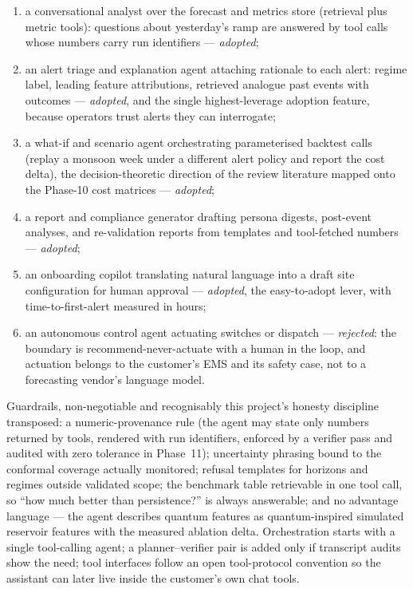 \begin{enumerate}
\item a conversational analyst over the forecast and metrics store
  (retrieval plus metric tools): questions about yesterday's ramp are
  answered by tool calls whose numbers carry run identifiers ---
  \emph{adopted};
\item an alert triage and explanation agent attaching rationale to each
  alert: regime label, leading feature attributions, retrieved analogue
  past events with outcomes --- \emph{adopted}, and the single
  highest-leverage adoption feature, because operators trust alerts they
  can interrogate;
\item a what-if and scenario agent orchestrating parameterised backtest
  calls (replay a monsoon week under a different alert policy and report
  the cost delta), the decision-theoretic direction of the review
  literature mapped onto the Phase-10 cost matrices --- \emph{adopted};
\item a report and compliance generator drafting persona digests,
  post-event analyses, and re-validation reports from templates and
  tool-fetched numbers --- \emph{adopted};
\item an onboarding copilot translating natural language into a draft site
  configuration for human approval --- \emph{adopted}, the
  easy-to-adopt lever, with time-to-first-alert measured in hours;
\item an autonomous control agent actuating switches or dispatch ---
  \emph{rejected}: the boundary is recommend-never-actuate with a human in
  the loop, and actuation belongs to the customer's EMS and its safety
  case, not to a forecasting vendor's language model.
\end{enumerate}

Guardrails, non-negotiable and recognisably this project's honesty
discipline transposed: a numeric-provenance rule (the agent may state only
numbers returned by tools, rendered with run identifiers, enforced by a
verifier pass and audited with zero tolerance in Phase~11); uncertainty
phrasing bound to the conformal coverage actually monitored; refusal
templates for horizons and regimes outside validated scope; the benchmark
table retrievable in one tool call, so ``how much better than
persistence?'' is always answerable; and no advantage language --- the
agent describes quantum features as quantum-inspired simulated reservoir
features with the measured ablation delta. Orchestration starts with a
single tool-calling agent; a planner--verifier pair is added only if
transcript audits show the need; tool interfaces follow an open
tool-protocol convention so the assistant can later live inside the
customer's own chat tools.

